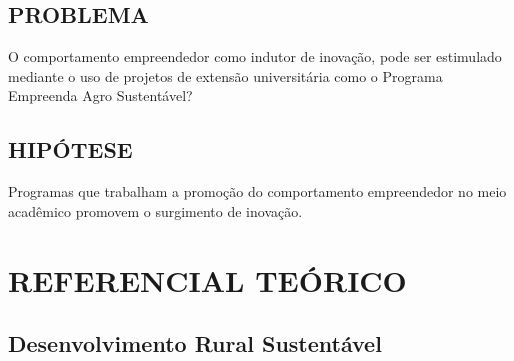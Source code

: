 \section{PROBLEMA}

O comportamento empreendedor como indutor de inovação, pode ser estimulado mediante o uso de projetos de extensão universitária como o Programa Empreenda Agro Sustentável? 


\section{HIPÓTESE}

Programas que trabalham a promoção do comportamento empreendedor no meio acadêmico promovem o surgimento de inovação.









\chapter{REFERENCIAL TEÓRICO}

\section{Desenvolvimento Rural Sustentável}

